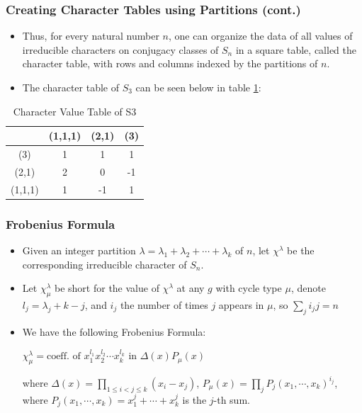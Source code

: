 \documentclass{beamer}
\begin{document}
\begin{frame}
\frametitle{Creating Character Tables using Partitions (cont.)}
\begin{itemize}
    \item Thus, for every natural number $n$, one can organize the data of all values of irreducible characters on conjugacy classes of $S_{n}$ in a square table, called the character table, with rows and columns indexed by the partitions of $n$. 
    \item The character table of $S_{3}$ can be seen below in table \ref{tab:s3}:
\end{itemize}

\begin{table}[htbp]
    \centering
    \label{tab:s3}
    \begin{tabular}{c|c c c}
        & (1,1,1) & (2,1) & (3) \\
        \hline
        (3) & 1 & 1 & 1 \\
        (2,1) & 2 & 0 & -1 \\
        (1,1,1) & 1 & -1 & 1 \\
    \end{tabular}
    \caption{Character Value Table of S3}
\end{table}
\end{frame}

\begin{frame}
\frametitle{Frobenius Formula}
\begin{theorem} 
    \begin{itemize}
\item Given an integer partition $\lambda = \lambda_1 + \lambda_2 + \cdots + \lambda_k$ of $n$, let $\chi^{\lambda}$ be the corresponding irreducible character of $S_n$. 
\item Let $\chi^{\lambda}_{\mu}$ be short for the value of $\chi^{\lambda}$ at any $g$ with cycle type $\mu$, denote $l_j  =\lambda_j + k - j$, and $i_j$ the number of times $j$ appears in $\mu$, so $\sum\limits_j i_jj = n$
\item We have the following Frobenius Formula: 

 $\chi^{\lambda}_{\mu} = \text{coeff. of }  x_{1}^{l_1} x_{2}^{l_2}\cdots x_{k}^{l_k}$ in $\Delta(x) P_{\mu}(x)$
 
  
where $\Delta(x) = \prod\limits_{1 \leq i < j \leq k} (x_i-x_j)$, $P_\mu(x) = \prod\limits_j P_j(x_1,\cdots, x_k)^{i_j}$, where $P_j(x_1,\cdots, x_k) = x_1^j + \cdots + x_k^j$ is the $j$-th sum.
\end{itemize}
\end{theorem}
\end{frame}
\end{document}

